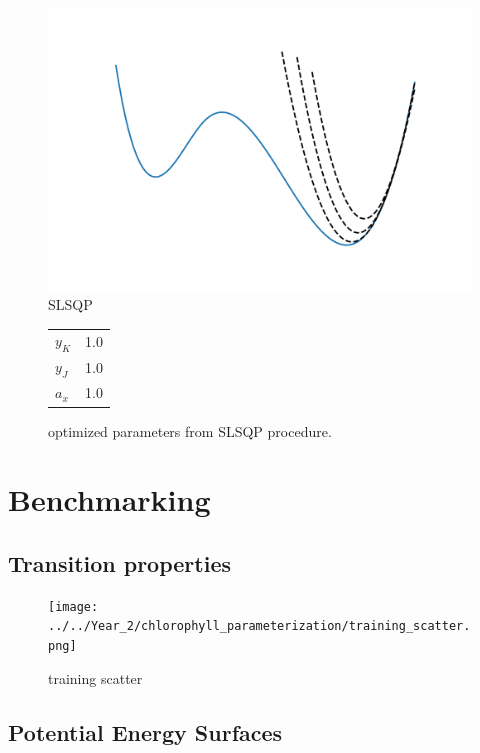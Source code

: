 \begin{figure}
    \includegraphics{SLSQP.png}
    \caption{SLSQP}
\end{figure}


\begin{figure}
    \centering
    \begin{tabular}{l | r}
        \hline
        $y_K$ & 1.0 \\
        $y_J$ & 1.0 \\
        $a_x$ & 1.0 \\
        \hline
    \end{tabular}
    \caption{optimized parameters from SLSQP procedure.}
    \centering
\end{figure}

\section{Benchmarking}
\label{sec:chl_benchmarking}

\subsection{Transition properties}
\label{subsec:transition_properties}

\begin{figure}
    \texttt{[image: ../../Year\_2/chlorophyll\_parameterization/training\_scatter.png]}
    \caption{training scatter}
\end{figure}

\subsection{Potential Energy Surfaces}
\label{subsec:pot_energy_surfaces}

